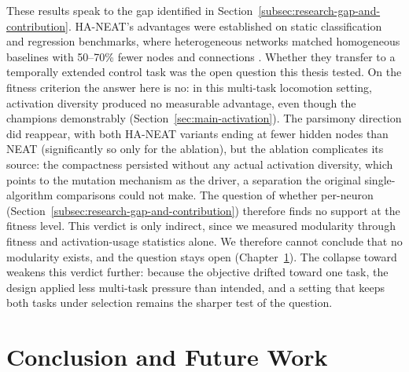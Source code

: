 These results speak to the gap identified in Section~\ref{subsec:research-gap-and-contribution}.
HA-NEAT's advantages were established on static classification and regression benchmarks, where heterogeneous networks matched homogeneous baselines with 50--70\% fewer nodes and connections \parencite{hagg_evolving_2017}. Whether they transfer to a temporally extended control task was the open question this thesis tested.
On the fitness criterion the answer here is no: in this multi-task locomotion setting, activation diversity produced no measurable advantage, even though the champions demonstrably  (Section~\ref{sec:main-activation}).
The parsimony direction did reappear, with both HA-NEAT variants ending at fewer hidden nodes than NEAT (significantly so only for the ablation), but the ablation complicates its source: the compactness persisted without any actual activation diversity, which points to the mutation mechanism as the driver, a separation the original single-algorithm comparisons could not make.
The question of whether per-neuron   (Section~\ref{subsec:research-gap-and-contribution}) therefore finds no support at the fitness level.
This verdict is only indirect, since we measured modularity through fitness and activation-usage statistics alone. We therefore cannot conclude that no modularity exists, and the question stays open (Chapter~\ref{sec:conclusion-and-future-work}).
The collapse toward  weakens this verdict further: because the objective drifted toward one task, the design applied less multi-task pressure than intended, and a setting that keeps both tasks under selection remains the sharper test of the question.




\chapter{Conclusion and Future Work}
\label{sec:conclusion-and-future-work}

